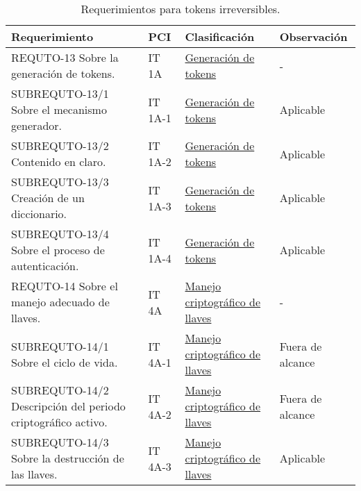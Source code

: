 \begin{table}[H]
  \centering
  \begin{tabular}{| p{5.5cm} | p{2cm} | p{4cm} | p{4cm} |}

    \hline
      \textbf{Requerimiento}    &
      \textbf{PCI}              &
      \textbf{Clasificación}    &
      \textbf{Observación}     \\ [0.8ex]
    \hline

    REQUTO-13 Sobre la generación de tokens.  
    &  IT 1A    &  \hyperref[dm:gen_tokens]{Generación de tokens}              &  -                \\ \hline
    SUBREQUTO-13/1 Sobre el mecanismo generador.  
    &  IT 1A-1  &  \hyperref[dm:gen_tokens]{Generación de tokens}              &  Aplicable        \\ \hline
    SUBREQUTO-13/2 Contenido en claro.  
    &  IT 1A-2  &  \hyperref[dm:gen_tokens]{Generación de tokens}              &  Aplicable        \\ \hline
    SUBREQUTO-13/3 Creación de un diccionario.  
    &  IT 1A-3  &  \hyperref[dm:gen_tokens]{Generación de tokens}              &  Aplicable        \\ \hline
    SUBREQUTO-13/4 Sobre el proceso de autenticación.  
    &  IT 1A-4  &  \hyperref[dm:gen_tokens]{Generación de tokens}              &  Aplicable        \\ \hline
    REQUTO-14 Sobre el manejo adecuado de llaves.  
    &  IT 4A    &  \hyperref[dm:man_llaves]{Manejo criptográfico de llaves}    &  -                \\ \hline
    SUBREQUTO-14/1 Sobre el ciclo de vida.  
    &  IT 4A-1  &  \hyperref[dm:man_llaves]{Manejo criptográfico de llaves}    &  Fuera de alcance \\ \hline
    SUBREQUTO-14/2 Descripción del periodo criptográfico activo.  
    &  IT 4A-2  &  \hyperref[dm:man_llaves]{Manejo criptográfico de llaves}    &  Fuera de alcance \\ \hline
    SUBREQUTO-14/3 Sobre la destrucción de las llaves.  
    &  IT 4A-3  &  \hyperref[dm:man_llaves]{Manejo criptográfico de llaves}    &  Aplicable        \\ \hline

  \end{tabular}
  \caption{Requerimientos para tokens irreversibles.}
\end{table}

